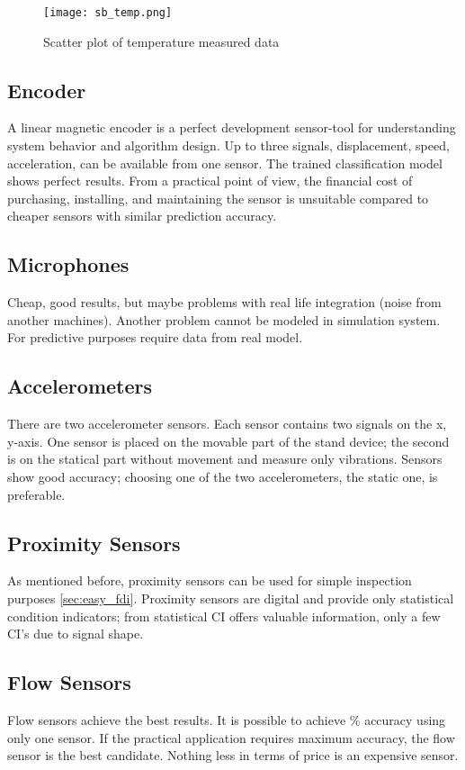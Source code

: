 \begin{figure}[h!]
    \centering
    \texttt{[image: sb\_temp.png]}
    \caption{Scatter plot of temperature measured data}
    \label{fig:temp_scatter}
\end{figure}

\subsection{Encoder}
A linear magnetic encoder is a perfect development sensor-tool for
understanding system behavior and algorithm design. Up to three signals,
displacement, speed, acceleration, can be available from one sensor. The
trained classification model shows perfect results. From a practical point
of view, the financial cost of purchasing, installing, and maintaining the
sensor is unsuitable compared to cheaper sensors with similar prediction
accuracy.

\subsection{Microphones}
Cheap, good results, but maybe problems with real life integration (noise
from another machines). Another problem cannot be modeled in simulation
system. For predictive purposes require data from real model.


\subsection{Accelerometers}
There are two accelerometer sensors. Each sensor contains two signals on
the x, y-axis.  One sensor is placed on the movable part of the stand
device; the second is on the statical part without movement and measure
only vibrations. Sensors show good accuracy; choosing one of the two
accelerometers, the static one, is preferable.

\subsection{Proximity Sensors}
As mentioned before, proximity sensors can be used for simple inspection
purposes \ref{sec:easy_fdi}. Proximity sensors are digital and provide only
statistical condition indicators; from statistical CI offers valuable
information, only a few CI's due to signal shape.

\subsection{Flow Sensors}
Flow sensors achieve the best results. It is possible to achieve 
\% accuracy using only one sensor. If the practical application requires
maximum accuracy, the flow sensor is the best candidate. Nothing less in
terms of price is an expensive sensor.

